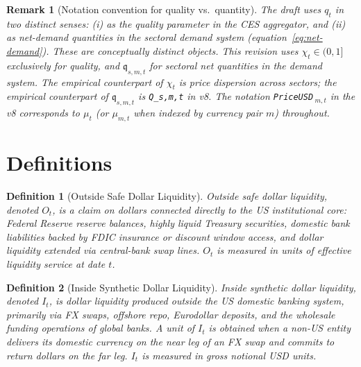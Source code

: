 \documentclass[12pt]{article}
\newtheorem{definition}{Definition}
\newtheorem{remark}{Remark}
\theoremstyle{definition}
\newcommand{\1}[1]{\mathds{1}\left[#1\right]}
\begin{document}
\begin{remark}[Notation convention for quality vs.\ quantity]
  \label{rem:notation}
  The draft uses $q_t$ in two distinct senses: (i) as the quality parameter
  in the CES aggregator, and (ii) as net-demand quantities in the sectoral
  demand system (equation~\eqref{eq:net-demand}). These are conceptually
  distinct objects. This revision uses $\chi_t \in (0,1]$ exclusively for
  quality, and $\mathfrak{q}_{s,m,t}$ for sectoral net quantities in the
  demand system. The empirical counterpart of $\chi_t$ is price dispersion
  across sectors; the empirical counterpart of $\mathfrak{q}_{s,m,t}$ is
  \texttt{Q\_{s,m,t}} in v8. The notation \texttt{PriceUSD}\,$_{m,t}$ in the
  v8 corresponds to $\mu_t$ (or $\mu_{m,t}$ when indexed by currency pair $m$)
  throughout.
\end{remark}

\section{Definitions}
\label{sec:definitions}

\begin{definition}[Outside Safe Dollar Liquidity]
  \label{def:outside}
  \emph{Outside safe dollar liquidity}, denoted $O_t$, is a claim on dollars
  connected directly to the US institutional core: Federal Reserve reserve
  balances, highly liquid Treasury securities, domestic bank liabilities backed
  by FDIC insurance or discount window access, and dollar liquidity extended via
  central-bank swap lines. $O_t$ is measured in units of effective liquidity
  service at date $t$.
\end{definition}

\begin{definition}[Inside Synthetic Dollar Liquidity]
  \label{def:inside}
  \emph{Inside synthetic dollar liquidity}, denoted $I_t$, is dollar liquidity
  produced outside the US domestic banking system, primarily via FX swaps, offshore
  repo, Eurodollar deposits, and the wholesale funding operations of global
  banks. A unit of $I_t$ is obtained when a non-US entity delivers its domestic
  currency on the near leg of an FX swap and commits to return dollars on the
  far leg. $I_t$ is measured in gross notional USD units.
\end{definition}
\end{document}

